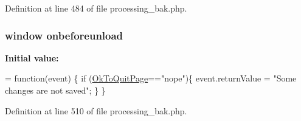 Definition at line 484 of file processing\-\_\-bak.\-php.

\hypertarget{processing__bak_8php_a12dd03abd8fa9daa2fe8eaeb9c9682c3}{
\subsubsection[{onbeforeunload}]{\setlength{\rightskip}{0pt plus 5cm}window onbeforeunload}}\label{processing__bak_8php_a12dd03abd8fa9daa2fe8eaeb9c9682c3}
{\bfseries Initial value\-:}
\begin{DoxyCode}
= \textcolor{keyword}{function}(event) \{
    \textcolor{keywordflow}{if} (\hyperlink{obsolete_2processing__bak_8php_a737a9dd58b5139e64ee8903b481e9aa8}{OkToQuitPage}==\textcolor{stringliteral}{"nope"})\{
        \textcolor{keyword}{event}.returnValue = \textcolor{stringliteral}{"Some changes are not saved"};
    \}
\}
\end{DoxyCode}


Definition at line 510 of file processing\-\_\-bak.\-php.


